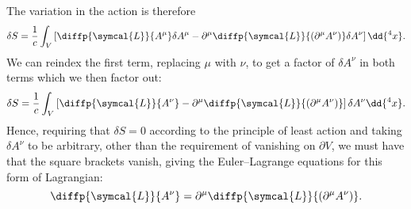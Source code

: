 \documentclass[fleqn]{NotesClass}
\newcommand*{\lagrangianDensity}{\symcal{L}}
\begin{document}
    The variation in the action is therefore
    \begin{equation}
        \delta S = \frac{1}{c} \int_V \left[ \diffp{\lagrangianDensity}{A^\mu} \delta A^\mu - \partial^\mu \diffp{\lagrangianDensity}{(\partial^\mu A^\nu)} \delta A^\nu \right] \dd{^4x}.
    \end{equation}
    We can reindex the first term, replacing \(\mu\) with \(\nu\), to get a factor of \(\delta A^\nu\) in both terms which we then factor out:
    \begin{equation}
        \delta S = \frac{1}{c} \int_V \left[ \diffp{\lagrangianDensity}{A^\nu} - \partial^\mu \diffp{\lagrangianDensity}{(\partial^\mu A^\nu)} \right] \delta A^\nu \dd{^4x}.
    \end{equation}
    Hence, requiring that \(\delta S = 0\) according to the principle of least action and taking \(\delta A^\nu\) to be arbitrary, other than the requirement of vanishing on \(\partial V\), we must have that the square brackets vanish, giving the Euler--Lagrange equations for this form of Lagrangian:
    \begin{equation}
        \diffp{\lagrangianDensity}{A^\nu} = \partial^\mu \diffp{\lagrangianDensity}{(\partial^\mu A^\nu)}.
    \end{equation}
    
\end{document}
